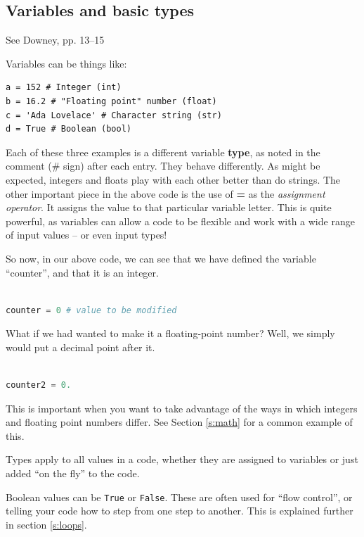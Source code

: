 \documentclass[a4paper,10pt]{scrartcl}
\begin{document}
\subsection{Variables and basic types}

\begin{framed}
See Downey, pp. 13--15
\end{framed}

Variables can be things like:
\begin{lstlisting}
a = 152 # Integer (int)
b = 16.2 # "Floating point" number (float)
c = 'Ada Lovelace' # Character string (str)
d = True # Boolean (bool)
\end{lstlisting}

Each of these three examples is a different variable \textbf{type}, as noted in the comment (\# sign) after each entry. They behave differently. As might be expected, integers and floats play with each other better than do strings. The other important piece in the above code is the use of \textbf{=} as the \emph{assignment operator}. It assigns the value to that particular variable letter. This is quite powerful, as variables can allow a code to be flexible and work with a wide range of input values -- or even input types!

So now, in our above code, we can see that we have defined the variable ``counter'', and that it is an integer.
\begin{lstlisting}[belowskip=-1.6\baselineskip, language=python]

counter = 0 # value to be modified
\end{lstlisting}

What if we had wanted to make it a floating-point number? Well, we simply would put a decimal point after it.
\begin{lstlisting}[belowskip=-1.6\baselineskip, language=python]

counter2 = 0.
\end{lstlisting}

This is important when you want to take advantage of the ways in which integers and floating point numbers differ. See Section \ref{s:math} for a common example of this.

Types apply to all values in a code, whether they are assigned to variables or just added ``on the fly'' to the code.

Boolean values can be \lstinline{True} or \lstinline{False}. These are often used for ``flow control'', or telling your code how to step from one step to another. This is explained further in section \ref{s:loops}.
\end{document}
